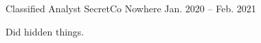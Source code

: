 \resumeExperience
  {Classified Analyst}
  {SecretCo}
  {Nowhere}
  {Jan. 2020 -- Feb. 2021}
  {
    \item Did hidden things.
  }
